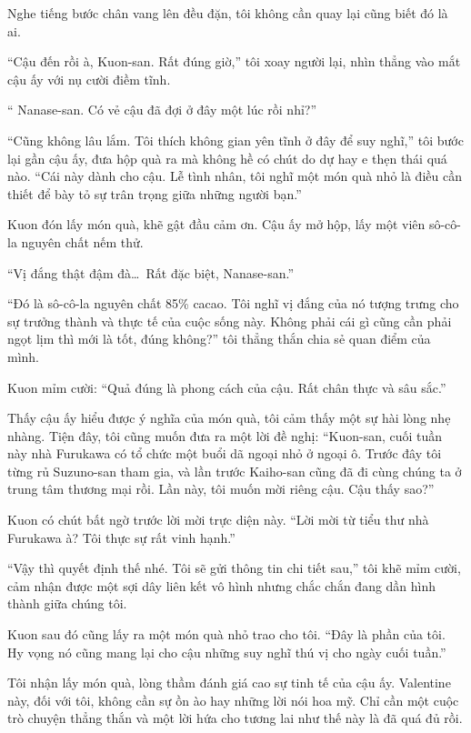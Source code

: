 \documentclass[../main.tex]{subfiles}
\begin{document}
Nghe tiếng bước chân vang lên đều đặn, tôi không cần quay lại cũng biết đó là ai.

``Cậu đến rồi à, Kuon-san. Rất đúng giờ,'' tôi xoay người lại, nhìn thẳng vào mắt cậu ấy với nụ cười điềm tĩnh.

`` Nanase-san. Có vẻ cậu đã đợi ở đây một lúc rồi nhỉ?''

``Cũng không lâu lắm. Tôi thích không gian yên tĩnh ở đây để suy nghĩ,'' tôi bước lại gần cậu ấy, đưa hộp quà ra mà không hề có chút do dự hay e thẹn thái quá nào. ``Cái này dành cho cậu. Lễ tình nhân, tôi nghĩ một món quà nhỏ là điều cần thiết để bày tỏ sự trân trọng giữa những người bạn.''

Kuon đón lấy món quà, khẽ gật đầu cảm ơn. Cậu ấy mở hộp, lấy một viên sô-cô-la nguyên chất nếm thử.

``Vị đắng thật đậm đà\dots\ Rất đặc biệt, Nanase-san.''

``Đó là sô-cô-la nguyên chất 85\% cacao. Tôi nghĩ vị đắng của nó tượng trưng cho sự trưởng thành và thực tế của cuộc sống này. Không phải cái gì cũng cần phải ngọt lịm thì mới là tốt, đúng không?'' tôi thẳng thắn chia sẻ quan điểm của mình.

Kuon mỉm cười: ``Quả đúng là phong cách của cậu. Rất chân thực và sâu sắc.''

Thấy cậu ấy hiểu được ý nghĩa của món quà, tôi cảm thấy một sự hài lòng nhẹ nhàng. Tiện đây, tôi cũng muốn đưa ra một lời đề nghị: ``Kuon-san, cuối tuần này nhà Furukawa có tổ chức một buổi dã ngoại nhỏ ở ngoại ô. Trước đây tôi từng rủ Suzuno-san tham gia, và lần trước Kaiho-san cũng đã đi cùng chúng ta ở trung tâm thương mại rồi. Lần này, tôi muốn mời riêng cậu. Cậu thấy sao?''

Kuon có chút bất ngờ trước lời mời trực diện này. ``Lời mời từ tiểu thư nhà Furukawa à? Tôi thực sự rất vinh hạnh.''

``Vậy thì quyết định thế nhé. Tôi sẽ gửi thông tin chi tiết sau,'' tôi khẽ mỉm cười, cảm nhận được một sợi dây liên kết vô hình nhưng chắc chắn đang dần hình thành giữa chúng tôi.

Kuon sau đó cũng lấy ra một món quà nhỏ trao cho tôi. ``Đây là phần của tôi. Hy vọng nó cũng mang lại cho cậu những suy nghĩ thú vị cho ngày cuối tuần.''

Tôi nhận lấy món quà, lòng thầm đánh giá cao sự tinh tế của cậu ấy. Valentine này, đối với tôi, không cần sự ồn ào hay những lời nói hoa mỹ. Chỉ cần một cuộc trò chuyện thẳng thắn và một lời hứa cho tương lai như thế này là đã quá đủ rồi.
\end{document}
